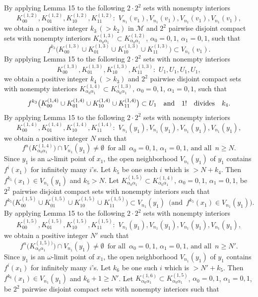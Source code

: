 \documentclass[12pt]{article}
\newcommand{\al}{\alpha}
\begin{document}
\indent By applying Lemma 15 to the following $2 \cdot 2^2$ sets with nonempty interiors 
$$
K_{00}^{(1,2)}, K_{01}^{(1,2)}, K_{10}^{(1,2)}, K_{11}^{(1,2)}: \,\, V_{n_1}(v_1), V_{n_1}(v_1), V_{n_1}(v_1), V_{n_1}(v_1),
$$
we obtain a positive integer $k_3 \, (> k_2)$ in $\mathcal M$ and $2^2$ pairwise disjoint compact sets with nonempty interiors $K_{\al_0\al_1}^{(1,3)} \subset K_{\al_0\al_1}^{(1,2)}$, $\al_0 = 0, 1$, $\al_1 = 0, 1$, such that 
$$
f^{k_3}\big(K_{00}^{(1,3)} \cup K_{01}^{(1,3)} \cup K_{10}^{(1,3)} \cup K_{11}^{(1,3)}\big) \subset V_{n_1}(v_1).
$$
\indent By applying Lemma 15 to the following $2 \cdot 2^2$ sets with nonempty interiors 
$$
K_{00}^{(1,3)}, K_{01}^{(1,3)}, K_{10}^{(1,3)}, K_{11}^{(1,3)}: \,\, U_1, U_1, U_1, U_1,
$$
we obtain a positive integer $k_4 \, (> k_3)$ and $2^2$ pairwise disjoint compact sets with nonempty interiors $K_{\al_0\al_1}^{(1,4)} \subset K_{\al_0\al_1}^{(1,3)}$, $\al_0 = 0, 1$, $\al_1 = 0, 1$, such that 
$$
f^{k_3}\big(K_{00}^{(1,4)} \cup K_{01}^{(1,4)} \cup K_{10}^{(1,4)} \cup K_{11}^{(1,4)}\big) \subset U_1 \quad \text{and} \quad 1! \quad \text{divides} \quad k_4.\vspace{.15in}
$$
\indent By applying Lemma 15 to the following $2 \cdot 2^2$ sets with nonempty interiors 
$$
K_{00}^{(1,4)}, K_{01}^{(1,4)}, K_{10}^{(1,4)}, K_{11}^{(1,4)}: \,\, V_{n_1}(y_1), V_{n_1}(y_1), V_{n_1}(y_1), V_{n_1}(y_1),
$$ 
we obtain a positive integer $N$ such that 
$$
f^n\big(K_{\al_0\al_1}^{(1,4)}\big) \cap V_{n_1}(y_1) \ne \emptyset \,\,\, \text{for all} \,\,\, \al_0 = 0, 1, \, \al_1 = 0, 1, \, \text{and all} \,\,\, n \ge N.
$$
\indent Since $y_1$ is an $\omega$-limit point of $x_1$, the open neighborhood $V_{n_1}(y_1)$ of $y_1$ contains $f^i(x_1)$ for infinitely many $i$'s.  Let $k_5$ be one such $i$ which is $> N+k_4$.  Then $f^{k_5}(x_1) \in V_{n_1}(y_1)$ and $k_5 > N$.  Let $K_{\al_0\al_1}^{(1,5)} \subset K_{\al_0\al_1}^{(1,4)}$, $\al_0 = 0, 1$, $\al_1 = 0, 1$, be $2^2$ pairwise disjoint compact sets with nonempty interiors such that 
$$
f^{k_5}\big(K_{00}^{(1,5)} \cup K_{01}^{(1,5)} \cup K_{10}^{(1,5)} \cup K_{11}^{(1,5)}\big) \subset V_{n_1}(y_1) \,\,\, \big(\text{and} \,\,\, f^{k_5}(x_1) \in V_{n_1}(y_1)\big).
$$
\indent By applying Lemma 15 to the following $2 \cdot 2^2$ sets with nonempty interiors 
$$
K_{00}^{(1,5)}, K_{01}^{(1,5)}, K_{10}^{(1,5)}, K_{11}^{(1,5)}: \,\, V_{n_1}(y_1), V_{n_1}(y_1), V_{n_1}(y_1), V_{n_1}(y_1),
$$
we obtain a positive integer $N'$ such that 
$$
f^n\big(K_{\al_0\al_1}^{(1,5))}\big) \cap V_{n_1}(y_1) \ne \emptyset \,\,\, \text{for all} \,\,\, \al_0 = 0, 1, \, \al_1 = 0, 1, \, \text{and all} \,\,\, n \ge N'.
$$\indent Since $y_1$ is an $\omega$-limit point of $x_1$, the open neighborhood $V_{n_1}(y_1)$ of $y_1$ contains $f^i(x_1)$ for infinitely many $i$'s.  Let $k_6$ be one such $i$ which is $> N'+k_5$.  Then $f^{k_6}(x_1) \in V_{n_1}(y_1)$ and $k_6+1 \ge N'$.  Let $K_{\al_0\al_1}^{(1,6)} \subset K_{\al_0\al_1}^{(1,5)}$, $\al_0 = 0, 1$, $\al_1 = 0, 1$, be $2^2$ pairwise disjoint compact sets with nonempty interiors such that 
\end{document}
